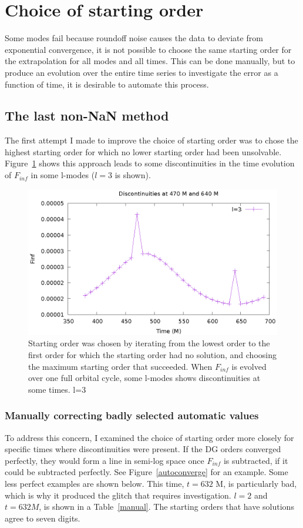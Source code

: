 \section{Choice of starting order}

Some modes fail because roundoff noise causes the data to deviate from exponential convergence, it is not possible to choose the same starting order for the extrapolation for all modes and all times. This can be done manually, but to produce an evolution over the entire time series to investigate the error as a function of time, it is desirable to automate this process.

\subsection{The last non-NaN method}

The first attempt I made to improve the choice of starting order was to chose the highest starting order for which no lower starting order had been unsolvable. Figure~\ref{finfovertimediscont} shows this approach leads to some discontinuities in the time evolution of $F_{inf}$ in some l-modes ($l=3$ is shown). 


\begin{figure}
  \includegraphics{finfovertimel3discontinuities}
  \caption{Starting order was chosen by iterating from the lowest order to the first order for which the starting order had no solution, and choosing the maximum starting order that succeeded. When $F_{inf}$ is evolved over one full orbital cycle, some l-modes shows discontinuities at some times. l=3}
\label{finfovertimediscont}
\end{figure}

\subsubsection{Manually correcting badly selected automatic values}
To address this concern, I examined the choice of starting order more closely for specific times where discontinuities were present. If the DG orders converged perfectly, they would form a line in semi-log space once $F_{inf}$ is subtracted, if it could be subtracted perfectly. See Figure~\ref{autoconverge} for an example. Some less perfect examples are shown below. This time, $t=632$ M, is particularly bad, which is why it produced the glitch that requires investigation. $l=2$ and $t=632M$, is shown in a Table~\ref{manual}. The starting orders that have solutions agree to seven digits. 

